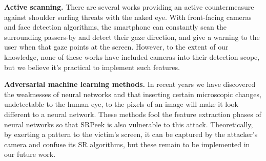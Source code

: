 \vspace{1mm}
\noindent
\textbf{Active scanning.} There are several works providing an active countermeasure against shoulder surfing threats with the naked eye. With front-facing cameras and face detection algorithms, the smartphone can constantly scan the surrounding passers-by and detect their gaze direction, and give a warning to the user when that gaze points at the screen. However, to the extent of our knowledge, none of these works have included cameras into their detection scope, but we believe it's practical to implement such features.

\vspace{1mm}
\noindent
\textbf{Adversarial machine learning methods.} In recent years we have discovered the weaknesses of neural networks and that inserting certain microscopic changes, undetectable to the human eye, to the pixels of an image will make it look different to a neural network. These methods fool the feature extraction phases of neural networks so that SRPeek is also vulnerable to this attack. Theoretically, by exerting a pattern to the victim's screen, it can be captured by the attacker's camera and confuse its SR algorithms, but these remain to be implemented in our future work.

